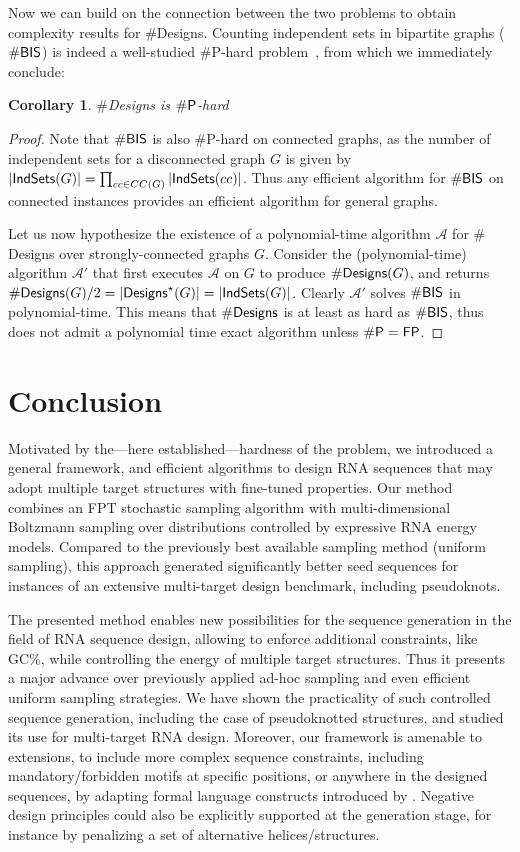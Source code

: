 \documentclass{bioinfo}
\newtheorem{corollary}[theorem]{Corollary}
\newcommand{\Design}[1]{{\sf Designs}^{\star}(#1)}
\newcommand{\NumDesign}{\ensuremath{\#}{\sf Designs}\xspace}
\newcommand{\IS}[1]{{\sf IndSets}(#1)}
\newcommand{\Nuc}[1]{{\sf #1}}
\newcommand{\Cb}{\Nuc{C}}
\newcommand{\Gb}{\Nuc{G}}
\newcommand{\GCb}{\Gb\Cb}
\begin{document}
Now we can build on the connection between the two problems to obtain complexity results for \NumDesign. Counting independent sets in bipartite graphs ($\#{\sf BIS}$) is indeed a well-studied \#{\sf P}-hard problem~\citep{Ge2012}, from which we immediately conclude:
\begin{corollary}
  \NumDesign is $\#{\sf P}$-hard
\end{corollary}
\begin{proof}
  Note that $\#{\sf BIS}$ is also \#{\sf P}-hard on connected graphs, as the number of independent sets for a disconnected graph $G$ is given by $|\IS{G}|=\prod_{cc\in CC(G)} |\IS{cc}|$. Thus any efficient algorithm for $\#{\sf BIS}$ on connected instances provides an efficient algorithm for general graphs.

  Let us now hypothesize the existence of a polynomial-time algorithm $\mathcal{A}$ for \NumDesign over strongly-connected graphs $G$. Consider the (polynomial-time) algorithm $\mathcal{A}'$ that first executes $\mathcal{A}$ on $G$ to produce $\NumDesign(G)$, and returns $\NumDesign(G)/2=|\Design{G}| = |\IS{G}|$. Clearly $\mathcal{A}'$ solves $\#{\sf BIS}$ in polynomial-time. This means that $\NumDesign$  is at least as hard as $\#{\sf BIS}$, thus does not admit a polynomial time exact algorithm unless $\#{\sf P}={\sf FP}$.
\end{proof}

\section{Conclusion}
Motivated by the---here established---hardness of the problem, we
introduced a general framework, and efficient algorithms to design RNA 
sequences that may adopt multiple target structures with fine-tuned
properties. Our method combines an FPT stochastic sampling algorithm
with multi-dimensional Boltzmann sampling over distributions
controlled by expressive RNA energy models.  Compared to the
previously best available sampling method (uniform sampling), this
approach generated significantly better seed sequences for instances
of an extensive multi-target design benchmark, including pseudoknots.

The presented method enables new possibilities for the sequence generation
in the field of RNA sequence design, allowing to enforce additional
constraints, like \GCb\%, while controlling the energy of
multiple target structures. Thus it presents a major advance over
previously applied ad-hoc sampling and even efficient uniform sampling
strategies. We have shown the practicality of such controlled sequence
generation, including the case of pseudoknotted structures, and studied its use for multi-target RNA design. Moreover,
our framework is amenable to extensions, to include more complex sequence
constraints, including mandatory/forbidden motifs at specific
positions, or anywhere in the designed sequences, by adapting formal language constructs 
introduced by \citet{Zhou2013}. Negative design principles could also 
be explicitly supported at the generation stage, for instance by
penalizing a set of alternative helices/structures. 
\end{document}
